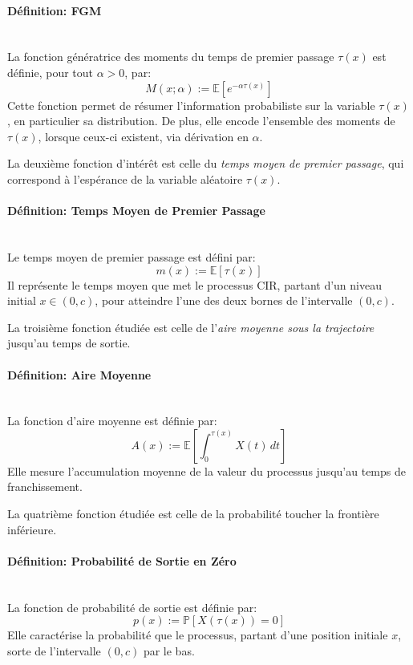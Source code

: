 \paragraph{Définition: \ac{FGM}}\mbox{}\\
La fonction génératrice des moments du temps de premier passage $\tau(x)$ est définie, pour tout $\alpha > 0$, par:
\begin{equation}\label{fgm}
    M(x;\alpha):= \mathds{E} \left[ e^{-\alpha \tau(x)} \right]
\end{equation}
Cette fonction permet de résumer l'information probabiliste sur la variable $\tau(x)$, en particulier sa distribution. De plus, elle encode l'ensemble des moments de $\tau(x)$, lorsque ceux-ci existent, via dérivation en $\alpha$. 

La deuxième fonction d'intérêt est celle du \textit{temps moyen de premier passage}, qui correspond à l'espérance de la variable aléatoire $\tau(x)$.
\paragraph{Définition: Temps Moyen de Premier Passage}\mbox{}\\
Le temps moyen de premier passage est défini par:
\begin{equation}\label{mean}
    m(x):= \mathds{E}[\tau(x)]
\end{equation}
Il représente le temps moyen que met le processus \acs{CIR}, partant d'un niveau initial $x \in (0,c)$, pour atteindre l'une des deux bornes de l'intervalle $(0,c)$.

La troisième fonction étudiée est celle de l'\textit{aire moyenne sous la trajectoire} jusqu'au temps de sortie.
\paragraph{Définition: Aire Moyenne}\mbox{}\\
La fonction d'aire moyenne est définie par:
\begin{equation}\label{area}
    A(x):= \mathds{E} \left[ \int_0^{\tau(x)} X(t)\,dt \right]
\end{equation}
Elle mesure l'accumulation moyenne de la valeur du processus jusqu'au temps de franchissement.

La quatrième fonction étudiée est celle de la probabilité toucher la frontière inférieure.
\paragraph{Définition: Probabilité de Sortie en Zéro}\mbox{}\\
La fonction de probabilité de sortie est définie par:
\begin{equation}\label{zero_exit_probability}
    p(x):=\mathds{P}[X(\tau(x))=0]
\end{equation}
Elle caractérise la probabilité que le processus, partant d'une position initiale $x$, sorte de l'intervalle $(0,c)$ par le bas.

